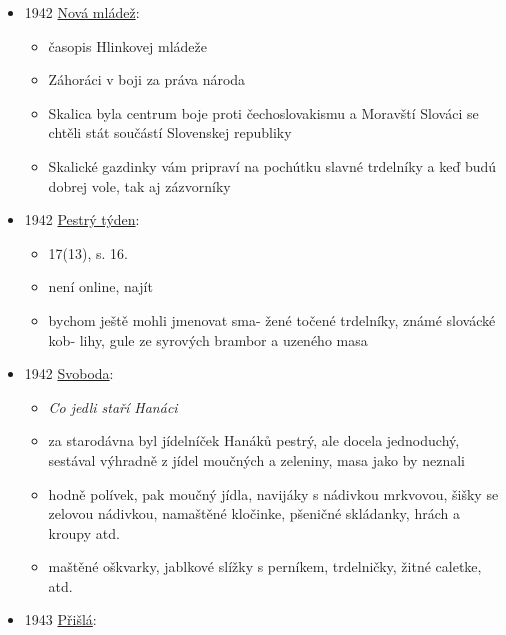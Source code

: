 \begin{itemize}
  \begin{itemize}
  \tightlist
  \item
    Božena Mrštíková
  \item
    vzpomínky na paní Hrdličkovou, která občas dělala trdelníky, který
    měl rád především Vilém
  \end{itemize}
\item
  1942
  \href{https://dikda.snk.sk/uuid/uuid:1d7f9dc9-2139-4760-83d7-7d58e659a26a}{Nová
  mládež}:

  \begin{itemize}
  \tightlist
  \item
    časopis Hlinkovej mládeže
  \item
    Záhoráci v boji za práva národa
  \item
    Skalica byla centrum boje proti čechoslovakismu a Moravští Slováci
    se chtěli stát součástí Slovenskej republiky
  \item
    Skalické gazdinky vám pripraví na pochútku slavné trdelníky a keď
    budú dobrej vole, tak aj zázvorníky
  \end{itemize}
\item
  1942
  \href{https://www.digitalniknihovna.cz/cuni_fsv/uuid/uuid:b2ec6826-435d-11dd-b505-00145e5790ea}{Pestrý
  týden}:

  \begin{itemize}
  \tightlist
  \item
    17(13), s. 16.
  \item
    není online, najít
  \item
    bychom ještě mohli jmenovat sma- žené točené trdelníky, známé
    slovácké kob- lihy, gule ze syrových brambor a uzeného masa
  \end{itemize}
\item
  1942
  \href{https://www.digitalniknihovna.cz/vkol/uuid/uuid:abbc5b46-3feb-42c2-bc61-af0afc8206c8}{Svoboda}:

  \begin{itemize}
  \tightlist
  \item
    \emph{Co jedli staří Hanáci}
  \item
    za starodávna byl jídelníček Hanáků pestrý, ale docela jednoduchý,
    sestával výhradně z jídel moučných a zeleniny, masa jako by neznali
  \item
    hodně polívek, pak moučný jídla, navijáky s nádivkou mrkvovou, šišky
    se zelovou nádivkou, namaštěné kločinke, pšeničné skládanky, hrách a
    kroupy atd.
  \item
    maštěné oškvarky, jablkové slížky s perníkem, trdelničky, žitné
    caletke, atd.
  \end{itemize}
\item
  1943
  \href{https://ceskadigitalniknihovna.cz/uuid/uuid:dc1db170-6fe9-11ed-a5ba-005056827e51}{Přišlá}:


\end{itemize}

